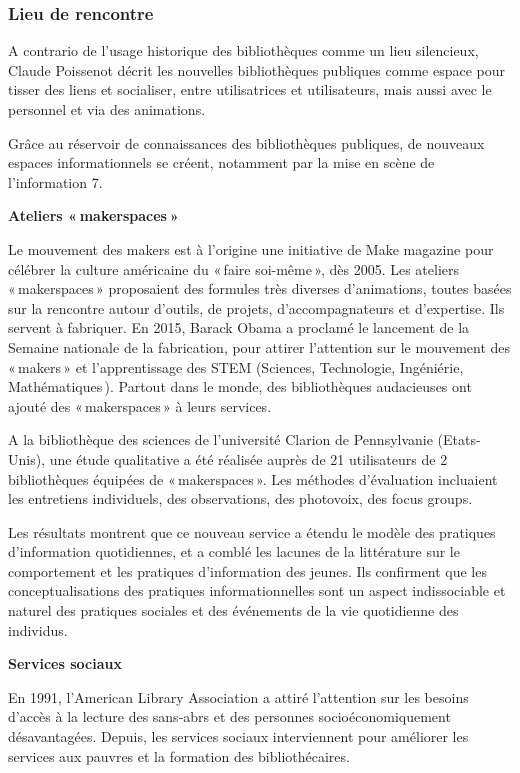 \documentclass[french,a4paper,12pt]{article}
\begin{document}
\subsubsection{Lieu de rencontre}

\quad A contrario de l’usage historique des bibliothèques comme un lieu silencieux, Claude Poissenot  décrit les nouvelles bibliothèques publiques comme espace pour tisser des liens et socialiser, entre utilisatrices et utilisateurs, mais aussi avec le personnel et via des animations. 

Grâce au réservoir de connaissances des bibliothèques publiques, de nouveaux espaces informationnels se créent, notamment par la mise en scène de l’information 7. 

\textbf{Ateliers « makerspaces »}

\quad Le mouvement des makers\citep{makers2020} est à l’origine une initiative de Make magazine pour célébrer la culture américaine du « faire soi-même », dès 2005. Les ateliers « makerspaces » proposaient des formules très diverses d’animations, toutes basées sur la rencontre autour d’outils, de projets, d’accompagnateurs et d’expertise. Ils servent à fabriquer. En 2015, Barack Obama a proclamé le lancement de la Semaine nationale de la fabrication, pour attirer l’attention sur le mouvement des « makers » et l’apprentissage des STEM (Sciences, Technologie, Ingéniérie, Mathématiques ). Partout dans le monde, des bibliothèques audacieuses ont ajouté des « makerspaces » à leurs services. 

A la bibliothèque des sciences de l’université Clarion de Pennsylvanie (Etats-Unis), une étude qualitative a été réalisée auprès de 21 utilisateurs de 2 bibliothèques équipées de « makerspaces ». Les méthodes d’évaluation incluaient les entretiens individuels, des observations, des photovoix, des focus groups. 

Les résultats montrent que ce nouveau service a étendu le modèle des pratiques d'information quotidiennes, et a comblé les lacunes de la littérature sur le comportement et les pratiques d'information des jeunes. Ils confirment que les conceptualisations des pratiques informationnelles sont un aspect indissociable et naturel des pratiques sociales et des événements de la vie quotidienne des individus. 

\textbf{Services sociaux}

\quad En 1991, l’American Library Association a attiré l’attention sur les besoins d’accès à la lecture des sans-abrs et des personnes socioéconomiquement désavantagées\citep{servicessociaux2008}. Depuis, les services sociaux interviennent pour améliorer les services aux pauvres et la formation des bibliothécaires.  
\end{document}
